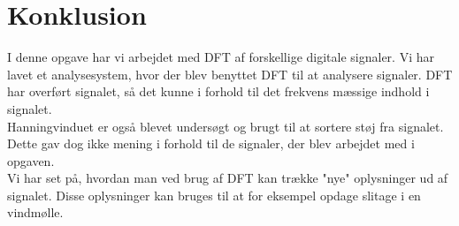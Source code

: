 \chapter{Konklusion}\label{ch:konclusion}
I denne opgave har vi arbejdet med DFT af forskellige digitale signaler. Vi har lavet et analysesystem, hvor der blev benyttet DFT til at analysere signaler. DFT har overført signalet, så det kunne i forhold til det frekvens mæssige indhold i signalet. \\ Hanningvinduet er også blevet undersøgt og brugt til at sortere støj fra signalet. Dette gav dog ikke mening i forhold til de signaler, der blev arbejdet med i opgaven.\\
Vi har set på, hvordan man ved brug af DFT kan trække "nye" oplysninger ud af signalet. Disse oplysninger kan bruges til at for eksempel opdage slitage i en vindmølle.